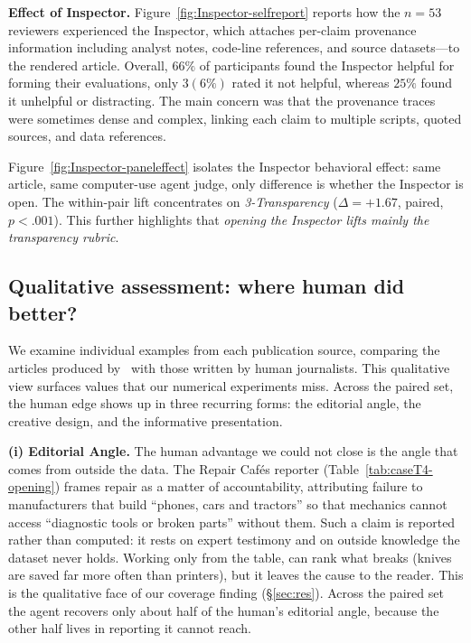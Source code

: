 \textbf{Effect of Inspector.}
Figure~\ref{fig:Inspector-selfreport} reports how the $n{=}53$ reviewers experienced the Inspector, which attaches per-claim provenance information including analyst notes, code-line references, and source datasets---to the rendered article. 
Overall, $66\%$ of participants found the Inspector helpful for forming their evaluations, only $3 (6\%)$ rated it not helpful, whereas $25\%$ found it unhelpful or distracting. The main concern was that the provenance traces were sometimes dense and complex, linking each claim to multiple scripts, quoted sources, and data references.

Figure~\ref{fig:Inspector-paneleffect} isolates the Inspector behavioral effect: same article, same computer-use agent judge, only difference is whether the Inspector is open. The within-pair lift concentrates on \emph{3-Transparency} ($\Delta{=}{+}1.67$, paired, $p{<}.001$). This further highlights that \textit{opening the Inspector lifts mainly the transparency rubric}.

\subsection{Qualitative assessment: where human did better?}
We examine individual examples from each publication source, comparing the articles produced by \method~with those written by human journalists. 
This qualitative view surfaces values that our numerical experiments miss. 
Across the paired set, the human edge shows up in three recurring forms: the editorial angle, the creative design, and the informative presentation.

\textbf{(i) Editorial Angle.}
The human advantage we could not close is the angle that comes from outside the data. The Repair Cafés reporter (Table~\ref{tab:caseT4-opening}) frames repair as a matter of accountability, attributing failure to manufacturers that build ``phones, cars and tractors'' so that mechanics cannot access ``diagnostic tools or broken parts'' without them. Such a claim is reported rather than computed: it rests on expert testimony and on outside knowledge the dataset never holds. Working only from the table, \methodshort{} can rank what breaks (knives are saved far more often than printers), but it leaves the cause to the reader. This is the qualitative face of our coverage finding (\S\ref{sec:res}). Across the paired set the agent recovers only about half of the human's editorial angle, because the other half lives in reporting it cannot reach.

